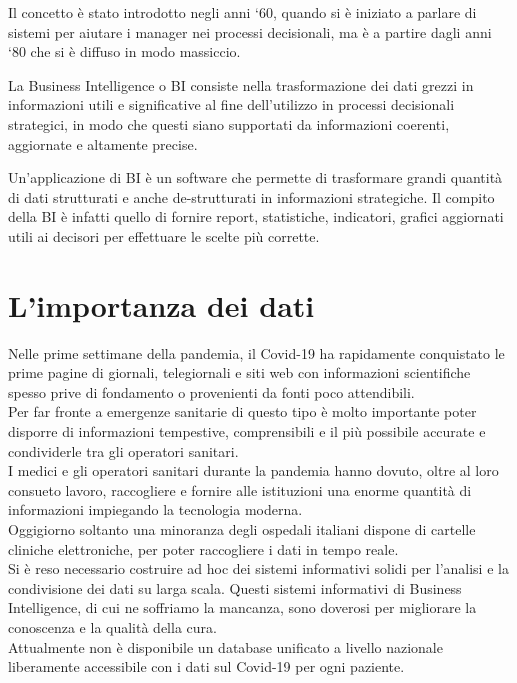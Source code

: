 Il concetto è stato introdotto negli anni ‘60, quando si è iniziato a parlare di sistemi per aiutare i manager nei processi decisionali, ma è a partire dagli anni ‘80 che si è diffuso in modo massiccio.
 
La Business Intelligence o BI consiste nella trasformazione dei dati grezzi in informazioni utili e significative al fine dell’utilizzo in processi decisionali strategici, in modo che questi siano supportati da informazioni coerenti, aggiornate e altamente precise.
 
Un'applicazione di BI è un software che permette di trasformare  grandi quantità di dati strutturati e anche de-strutturati in informazioni strategiche. Il compito della BI è infatti quello di fornire report, statistiche, indicatori, grafici aggiornati utili ai decisori per effettuare le scelte più corrette.
\pagebreak
\section{L'importanza dei dati}
Nelle prime settimane della pandemia, il Covid-19 ha rapidamente conquistato le prime pagine di giornali, telegiornali e siti web con informazioni scientifiche spesso prive di fondamento o provenienti da fonti poco attendibili.\\
Per far fronte a emergenze sanitarie di questo tipo è molto importante poter disporre di informazioni tempestive, comprensibili e il più possibile accurate e condividerle tra gli operatori sanitari.\\
I medici e gli operatori sanitari durante la pandemia hanno dovuto, oltre al loro consueto lavoro, raccogliere e fornire alle istituzioni una enorme quantità di informazioni impiegando la tecnologia moderna.\\
Oggigiorno soltanto una minoranza degli ospedali italiani dispone di cartelle cliniche elettroniche, per poter raccogliere i dati in tempo reale.\\
Si è reso necessario costruire ad hoc dei sistemi informativi solidi per l’analisi e la condivisione dei dati su larga scala.
Questi sistemi informativi di Business Intelligence, di cui ne soffriamo la mancanza, sono doverosi per migliorare la conoscenza e la qualità della cura.\\
Attualmente non è disponibile un database unificato a livello nazionale liberamente accessibile con i dati sul Covid-19 per ogni paziente.